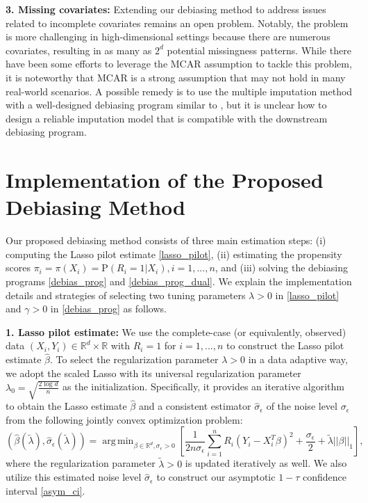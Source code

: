 \documentclass[ejsv2,noshowframe]{imsart}
\theoremstyle{plain}
\theoremstyle{definition}
\theoremstyle{remark}
\DeclareMathOperator*{\argmin}{arg\,min}
\newcommand{\norm}[1]{\left|\left| #1 \right|\right|}
\renewcommand{\hat}{\widehat}
\renewcommand{\tilde}{\widetilde}
\begin{document}
{\bf 3. Missing covariates:} Extending our debiasing method to address issues related to incomplete covariates remains an open problem. Notably, the problem is more challenging in high-dimensional settings because there are numerous covariates, resulting in as many as $2^d$ potential missingness patterns.
While there have been some efforts to leverage the MCAR assumption \citep{wang2019rate} to tackle this problem, it is noteworthy that MCAR is a strong assumption that may not hold in many real-world scenarios.
A possible remedy is to use the multiple imputation method \citep{carpenter2023multiple} with a well-designed debiasing program similar to \cite{xue2021semi,song2024semi}, but it is unclear how to design a reliable imputation model that is compatible with the downstream debiasing program.

\vspace{10mm}
\appendix

\section{Implementation of the Proposed Debiasing Method}
\label{app:imple_debias}

Our proposed debiasing method consists of three main estimation steps: (i) computing the Lasso pilot estimate \eqref{lasso_pilot}, (ii) estimating the propensity scores $\pi_i=\pi(X_i)=\mathrm{P}(R_i=1|X_i),i=1,...,n$, and (iii) solving the debiasing programs \eqref{debias_prog} and \eqref{debias_prog_dual}. We explain the implementation details and strategies of selecting two tuning parameters $\lambda>0$ in \eqref{lasso_pilot} and $\gamma >0$ in \eqref{debias_prog} as follows.

{\bf 1. Lasso pilot estimate:} We use the complete-case (or equivalently, observed) data $(X_i,Y_i) \in \mathbb{R}^d\times \mathbb{R}$ with $R_i=1$ for $i=1,...,n$ to construct the Lasso pilot estimate $\hat{\beta}$. To select the regularization parameter $\lambda>0$ in a data adaptive way, we adopt the scaled Lasso \citep{sun2012scaled} with its universal regularization parameter $\lambda_0=\sqrt{\frac{2\log d}{n}}$ as the initialization. Specifically, it provides an iterative algorithm to obtain the Lasso estimate $\hat{\beta}$ and a consistent estimator $\hat{\sigma}_{\epsilon}$ of the noise level $\sigma_{\epsilon}$ from the following jointly convex optimization problem:
$$\left(\hat{\beta}(\tilde{\lambda}), \hat{\sigma}_{\epsilon}(\tilde{\lambda})\right) = \argmin_{\beta\in \mathbb{R}^d, \sigma_{\epsilon} >0} \left[\frac{1}{2n\sigma_{\epsilon}} \sum_{i=1}^n R_i\left(Y_i - X_i^T\beta\right)^2 + \frac{\sigma_{\epsilon}}{2}+\tilde{\lambda}\norm{\beta}_1\right],$$
where the regularization parameter $\tilde{\lambda} >0$ is updated iteratively as well. We also utilize this estimated noise level $\hat{\sigma}_{\epsilon}$ to construct our asymptotic $1-\tau$ confidence interval \eqref{asym_ci}.
\end{document}
